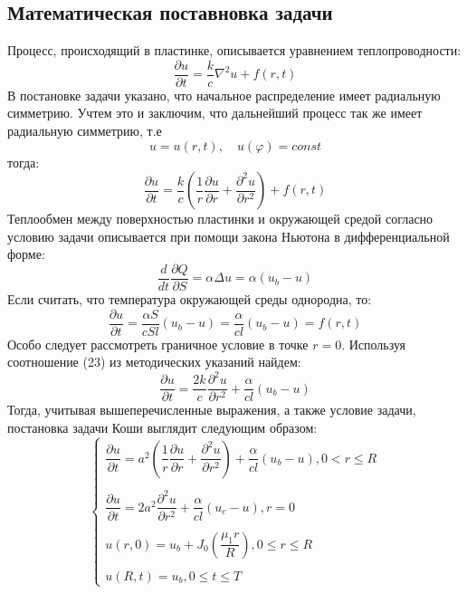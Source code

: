 \documentclass[a4paper,14pt,russian, fleqn]{extreport}
\begin{document}
	\subsection{Математическая поставновка задачи}
	Процесс, происходящий в пластинке, описывается уравнением теплопроводности:
	\begin{equation*}
	\dfrac{\partial u}{\partial t} = \dfrac{k}{c}\nabla^2u + f(r,t)
	\end{equation*}
	В постановке задачи указано, что начальное распределение имеет радиальную симметрию. Учтем это и заключим, что дальнейший процесс так же имеет радиальную симметрию, т.е 
	\begin{equation*}
	u = u(r,t), \quad u(\varphi) = const	
	\end{equation*}
	тогда:	
	\begin{equation*}
	\dfrac{\partial u}{\partial t} = \dfrac{k}{c} \left ( \dfrac{1}{r}\dfrac{\partial u}{\partial r} + \dfrac{\partial^2 u}{\partial r^2}\right ) + f(r,t)
	\end{equation*}
	Теплообмен между поверхностью пластинки и окружающей средой согласно условию задачи описывается при помощи закона Ньютона в дифференциальной форме:	
	\begin{equation*}
	\dfrac{d}{dt}\dfrac{\partial Q}{\partial S} = \alpha \Delta u  = \alpha (u_b - u)
	\end{equation*}
	Если считать, что температура окружающей среды однородна, то:	
	\begin{equation*}
	\dfrac{\partial u}{\partial t} = \dfrac{\alpha S}{cSl}(u_b - u) = \dfrac{\alpha}{cl}(u_b - u) = f(r,t)	
	\end{equation*}
	Особо следует рассмотреть граничное условие в точке $r = 0$. Используя соотношение (23) из методических указаний найдем:	
	\begin{equation*}
	\dfrac{\partial u}{\partial t} = \dfrac{2k}{c} \dfrac{\partial^2 u}{\partial r^2} + \dfrac{\alpha}{cl}(u_b - u)
	\end{equation*}
	Тогда, учитывая вышеперечисленные выражения, а также условие задачи, постановка задачи Коши выглядит следующим образом:	
	\begin{equation}\label{KoshiTask}
	\left \{
	\begin{array}{l}
	\dfrac{\partial u}{\partial t} = a^2 \left ( \dfrac{1}{r}\dfrac{\partial u}{\partial r} + \dfrac{\partial^2 u}{\partial r^2}\right ) + \dfrac{\alpha}{cl}(u_b - u), 0 < r \leq R\\
	\\
	\dfrac{\partial u}{\partial t} = 2a^2 \dfrac{\partial^2 u}{\partial r^2} + \dfrac{\alpha}{cl}(u_c - u), r = 0 \\
	\\
	u(r, 0) = u_b + J_0\left(\dfrac{\mu_1 r}{R}\right), 0 \leq r \leq R \\
	\\
	u(R, t) = u_b, 0 \leq t \leq T
	\end{array}
	\right.
	\end{equation}
\end{document}
